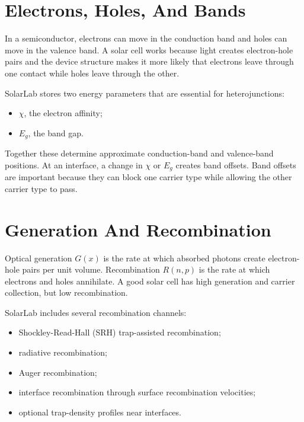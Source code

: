 \documentclass[
  11pt,
  american,
]{report}
\providecommand{\tightlist}{%
  \setlength{\itemsep}{0pt}\setlength{\parskip}{0pt}}
\begin{document}
\hypertarget{electrons-holes-and-bands}{%
\section{Electrons, Holes, And Bands}\label{electrons-holes-and-bands}}

In a semiconductor, electrons can move in the conduction band and holes
can move in the valence band. A solar cell works because light creates
electron-hole pairs and the device structure makes it more likely that
electrons leave through one contact while holes leave through the other.

SolarLab stores two energy parameters that are essential for
heterojunctions:

\begin{itemize}
\tightlist
\item
  \(\chi\), the electron affinity;
\item
  \(E_g\), the band gap.
\end{itemize}

Together these determine approximate conduction-band and valence-band
positions. At an interface, a change in \(\chi\) or \(E_g\) creates band
offsets. Band offsets are important because they can block one carrier
type while allowing the other carrier type to pass.

\hypertarget{generation-and-recombination}{%
\section{Generation And
Recombination}\label{generation-and-recombination}}

Optical generation \(G(x)\) is the rate at which absorbed photons create
electron-hole pairs per unit volume. Recombination \(R(n,p)\) is the
rate at which electrons and holes annihilate. A good solar cell has high
generation and carrier collection, but low recombination.

SolarLab includes several recombination channels:

\begin{itemize}
\tightlist
\item
  Shockley-Read-Hall (SRH) trap-assisted recombination;
\item
  radiative recombination;
\item
  Auger recombination;
\item
  interface recombination through surface recombination velocities;
\item
  optional trap-density profiles near interfaces.
\end{itemize}
\end{document}
